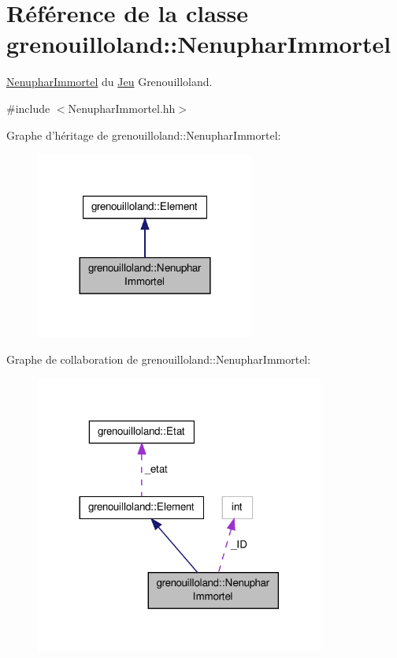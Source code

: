 \hypertarget{classgrenouilloland_1_1NenupharImmortel}{\section{Référence de la classe grenouilloland\-:\-:Nenuphar\-Immortel}
\label{classgrenouilloland_1_1NenupharImmortel}
}


\hyperlink{classgrenouilloland_1_1NenupharImmortel}{Nenuphar\-Immortel} du \hyperlink{classgrenouilloland_1_1Jeu}{Jeu} Grenouilloland.  




{\ttfamily \#include $<$Nenuphar\-Immortel.\-hh$>$}



Graphe d'héritage de grenouilloland\-:\-:Nenuphar\-Immortel\-:
\nopagebreak
\begin{figure}[H]
\begin{center}
\leavevmode
\includegraphics[width=204pt]{classgrenouilloland_1_1NenupharImmortel__inherit__graph}
\end{center}
\end{figure}


Graphe de collaboration de grenouilloland\-:\-:Nenuphar\-Immortel\-:
\nopagebreak
\begin{figure}[H]
\begin{center}
\leavevmode
\includegraphics[width=269pt]{classgrenouilloland_1_1NenupharImmortel__coll__graph}
\end{center}
\end{figure}
